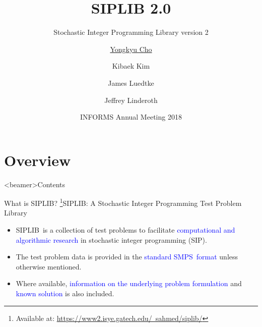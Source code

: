 \documentclass{beamer}
\title{\textbf{SIPLIB 2.0}}
\subtitle{Stochastic Integer Programming Library version 2}
\author{\underline{Yongkyu Cho}\inst{1}\inst{2} \and Kibaek Kim\inst{2} \\ \and James Luedtke\inst{3} \and Jeffrey Linderoth\inst{3}}
\institute[] %
{
	\inst{1}%
	Department of Industrial and Management Engineering\\
	Pohang University of Science and Technology
	\and
	\inst{2}%
	Mathematics and Computer Science Division\\
	Argonne National Laboratory
	\and
	\inst{3}%
	Department of Industrial and Systems Engineering\\
	University of Wisconsin-Madison
}
\date{INFORMS Annual Meeting 2018}
\newcommand{\siplib}{\textsf{SIPLIB}}
\newcommand{\smps}{\textsf{SMPS}}
\begin{document}
	
	\begin{frame}
		\titlepage
	\end{frame}

	\frame{
		\frametitle{Contents}
		\tableofcontents[hideothersubsections]
		\setcounter{tocdepth}{2}
	}
	
	\section{Overview}
	\begin{frame}<beamer>{Contents}
	\end{frame}	
	
	\begin{frame}{What is \siplib?}
	\footnote{\tiny Available at: \href{https://www2.isye.gatech.edu/~sahmed/siplib/}{https://www2.isye.gatech.edu/~sahmed/siplib/}}{\siplib}: A Stochastic Integer Programming Test Problem Library
	 	\begin{itemize}
	 		\item \siplib\ is a collection of test problems to facilitate \textcolor{blue}{computational and algorithmic research} in stochastic integer programming (SIP).
	 		\item The test problem data is provided in the \textcolor{blue}{standard \smps\ format} unless otherwise mentioned.
	 		\item Where available, \textcolor{blue}{information on the underlying problem formulation} and \textcolor{blue}{known solution} is also included.
	 	\end{itemize}
	\end{frame}
	
\end{document}
